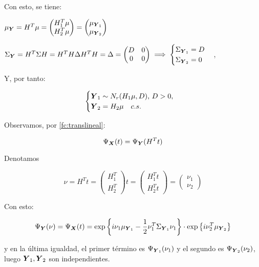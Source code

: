 Con esto, se tiene:
\begin{nlist}
\item $\mu_{\boldsymbol{Y}} = H^T \mu = \begin{pmatrix} H_1^T \mu \\ H_2^T\mu \end{pmatrix} = \begin{pmatrix} \mu_{\boldsymbol{Y}_1} \\ \mu_{\boldsymbol{Y}_2} \end{pmatrix}$
\item $\Sigma_{\boldsymbol{Y}} =  H^T \Sigma H = H^T H \Delta H^T H = \Delta = \begin{pmatrix} D & 0 \\ 0 & 0 \end{pmatrix} \implies \begin{cases} \Sigma_{\boldsymbol{Y}_1} = D \\ \Sigma_{\boldsymbol{Y}_2} = 0\end{cases}$,
\end{nlist}

Y, por tanto:

\[
\begin{cases} \boldsymbol{Y}_1 \sim N_r(H_1\mu,D),\, D> 0, \\ \boldsymbol{Y}_2 = H_2\mu \quad c.s. \end{cases}
\]

Observamos, por \ref{fc:translineal}:

\[
\Psi_{\boldsymbol{X}}(t) = \Psi_{\boldsymbol{Y}}(H^T t)
\]

Denotamos

\[
\nu = H^T t = \begin{pmatrix} H_1^T \\ H_2^T\end{pmatrix}t = \begin{pmatrix} H_1^Tt \\ H_2^Tt\end{pmatrix} = \begin{pmatrix} \nu_1 \\ \nu_2\end{pmatrix}
\]

Con esto:

\[
\Psi_{\boldsymbol{Y}}(\nu) = \Psi_{\boldsymbol{X}}(t) = \exp\left\{ i\nu_1\mu_{\boldsymbol{Y}_1} - \frac{1}{2} \nu_1^T \Sigma_{\boldsymbol{Y}_1}\nu_1 \right\} \cdot \exp\left\{i\nu_2^T \mu_{\boldsymbol{Y}_2}\right\}
\]

y en la última igualdad, el primer término es $\Psi_{\boldsymbol{Y}_1}(\nu_1)$ y el segundo es $\Psi_{\boldsymbol{Y}_2}(\nu_2)$, luego $\boldsymbol{Y}_1,\boldsymbol{Y}_2$ son independientes.

